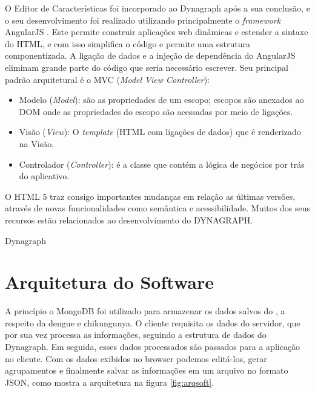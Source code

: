 O Editor de Características foi incorporado ao Dynagraph após a sua conclusão, e o seu desenvolvimento foi realizado utilizando principalmente o \textit{framework} AngularJS \cite{angularjs}.
Este permite construir aplicações web dinâmicas e estender a sintaxe do HTML, e com isso simplifica o código e permite uma estrutura componentizada. A ligação de dados e a injeção de dependência do AngularJS eliminam grande parte do código que seria necessário escrever.
Seu principal padrão arquitetural é o MVC (\textit{Model View Controller}):
\begin{itemize}
	\item Modelo (\textit{Model}): são as propriedades de um escopo; escopos são anexados ao DOM onde as propriedades do escopo são acessadas por meio de ligações.
	\item Visão (\textit{View}): O \textit{template} (HTML com ligações de dados) que é renderizado na Visão.
	\item Controlador (\textit{Controller}): é a classe que contém a lógica de negócios por trás do aplicativo.
\end{itemize}

O HTML 5 traz consigo importantes mudanças em relação as últimas versões, através de novas funcionalidades como semântica e acessibilidade. Muitos dos seus recursos estão relacionados ao desenvolvimento do DYNAGRAPH.

Dynagraph


\section{Arquitetura do Software}
A princípio o MongoDB foi utilizado para armazenar os dados salvos do \cite{simda}, a respeito da dengue e chikungunya. O cliente requisita os dados do servidor, que por sua vez processa as informações, seguindo a estrutura de dados do Dynagraph. Em seguida, esses dados processados são passados para a aplicação no cliente. Com os dados exibidos no browser podemos editá-los, gerar agrupamentos e finalmente salvar as informações em um arquivo no formato JSON, como mostra a arquitetura na figura \ref{fig:arqsoft}.

